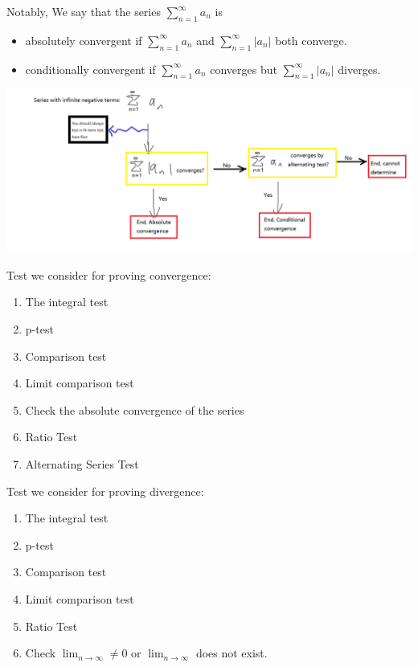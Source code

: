 \documentclass[12pt]{article}
\theoremstyle{definition}
\theoremstyle{definition}
\theoremstyle{remark}
\theoremstyle{definition}
\theoremstyle{definition}
\theoremstyle{definition}
\begin{document}
Notably, We say that the series $\sum_{n=1}^{\infty} a_n$ is
\begin{itemize}
\item absolutely convergent if $\sum_{n=1}^{\infty} a_n$ and $\sum_{n=1}^{\infty}|a_n|$ both converge.
\item conditionally convergent if $\sum_{n=1}^{\infty} a_n$ converges but $\sum_{n=1}^{\infty}|a_n|$ diverges.
\end{itemize}
\includegraphics[width=1\textwidth]{program2.png}

Test we consider for proving convergence:
\begin{enumerate}
	\item The integral test
	\item p-test
	\item Comparison test
	\item Limit comparison test
	\item Check the absolute convergence of the series
	\item Ratio Test
	\item Alternating Series Test
\end{enumerate}

Test we consider for proving divergence:
\begin{enumerate}
	\item The integral test
	\item p-test
	\item Comparison test
	\item Limit comparison test
	\item Ratio Test
	\item Check $\lim_{n \to \infty} \neq 0$ or $\lim_{n \to \infty}$ does not exist.
\end{enumerate}
\end{document}
